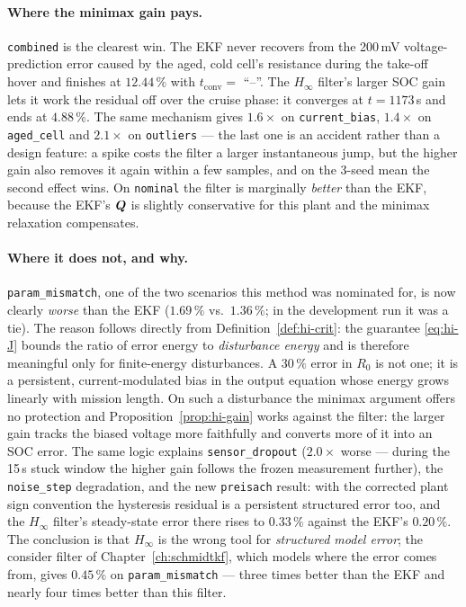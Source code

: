 \paragraph{Where the minimax gain pays.}  \texttt{combined} is the clearest win.  The EKF never
recovers from the 200\,mV voltage-prediction error caused by the aged, cold cell's resistance
during the take-off hover and finishes at $12.44\,\%$ with $t_\mathrm{conv}=$ ``--''.  The
$H_\infty$ filter's larger SOC gain lets it work the residual off over the cruise phase: it
converges at $t=1173$\,s and ends at $4.88\,\%$.  The same mechanism gives $1.6\times$ on
\texttt{current\_bias}, $1.4\times$ on \texttt{aged\_cell} and $2.1\times$ on \texttt{outliers} ---
the last one is an accident rather than a design feature: a spike costs the filter a larger
instantaneous jump, but the higher gain also removes it again within a few samples, and on the
3-seed mean the second effect wins.  On \texttt{nominal} the filter is marginally \emph{better}
than the EKF, because the EKF's $\bm{Q}$ is slightly conservative for this plant and the minimax
relaxation compensates.

\paragraph{Where it does not, and why.}  \texttt{param\_mismatch}, one of the two scenarios this
method was nominated for, is now clearly \emph{worse} than the EKF ($1.69\,\%$ vs.\ $1.36\,\%$; in
the development run it was a tie).  The reason follows directly from
Definition~\ref{def:hi-crit}: the guarantee \eqref{eq:hi-J} bounds the ratio of error energy to
\emph{disturbance energy} and is therefore meaningful only for finite-energy disturbances.  A
$30\,\%$ error in $R_0$ is not one; it is a persistent, current-modulated bias in the output
equation whose energy grows linearly with mission length.  On such a disturbance the minimax
argument offers no protection and Proposition~\ref{prop:hi-gain} works against the filter: the
larger gain tracks the biased voltage more faithfully and converts more of it into an SOC error.
The same logic explains \texttt{sensor\_dropout} ($2.0\times$ worse --- during the 15\,s stuck
window the higher gain follows the frozen measurement further), the \texttt{noise\_step}
degradation, and the new \texttt{preisach} result: with the corrected plant sign convention the
hysteresis residual is a persistent structured error too, and the $H_\infty$ filter's steady-state
error there rises to $0.33\,\%$ against the EKF's $0.20\,\%$.  The conclusion is that $H_\infty$ is
the wrong tool for \emph{structured model error}; the consider filter of
Chapter~\ref{ch:schmidtkf}, which models where the error comes from, gives $0.45\,\%$ on
\texttt{param\_mismatch} --- three times better than the EKF and nearly four times better than this
filter.

